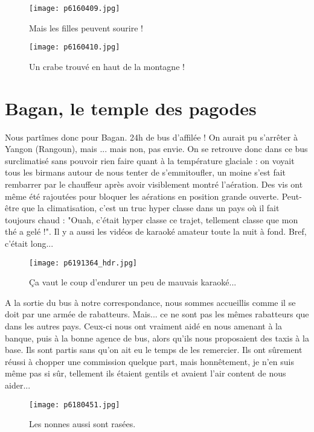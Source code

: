 \documentclass{book}
\begin{document}
\begin{figure}[h]
\centering
\texttt{[image: p6160409.jpg]}
\caption*{Mais les filles peuvent sourire !}
\end{figure}


\begin{figure}[h]
\centering
\texttt{[image: p6160410.jpg]}
\caption*{Un crabe trouvé en haut de la montagne !}
\end{figure}



\chapter{Bagan, le temple des pagodes}
Nous partîmes donc pour Bagan. 24h de bus d'affilée ! On aurait pu s'arrêter à Yangon (Rangoun), mais ... mais non, pas envie. On se retrouve donc dans ce bus surclimatisé sans pouvoir rien faire quant à la température glaciale : on voyait tous les birmans autour de nous tenter de s'emmitoufler, un moine s'est fait rembarrer par le chauffeur après avoir visiblement montré l'aération. Des vis ont même été rajoutées pour bloquer les aérations en position grande ouverte. Peut-être que la climatisation, c'est un truc hyper classe dans un pays où il fait toujours chaud : "Ouah, c'était hyper classe ce trajet, tellement classe que mon thé a gelé !". Il y a aussi les vidéos de karaoké amateur toute la nuit à fond. Bref, c'était long...


\begin{figure}[h]
\centering
\texttt{[image: p6191364\_hdr.jpg]}
\caption*{Ça vaut le coup d'endurer un peu de mauvais karaoké...}
\end{figure}

A la sortie du bus à notre correspondance, nous sommes accueillis comme il se doit par une armée de rabatteurs. Mais... ce ne sont pas les mêmes rabatteurs que dans les autres pays. Ceux-ci nous ont vraiment aidé en nous amenant à la banque, puis à la bonne agence de bus, alors qu'ils nous proposaient des taxis à la base. Ils sont partis sans qu'on ait eu le temps de les remercier. Ils ont sûrement réussi à chopper une commission quelque part, mais honnêtement, je n'en suis même pas si sûr, tellement ils étaient gentils et avaient l'air content de nous aider...


\begin{figure}[h]
\centering
\texttt{[image: p6180451.jpg]}
\caption*{Les nonnes aussi sont rasées.}
\end{figure}
\end{document}

